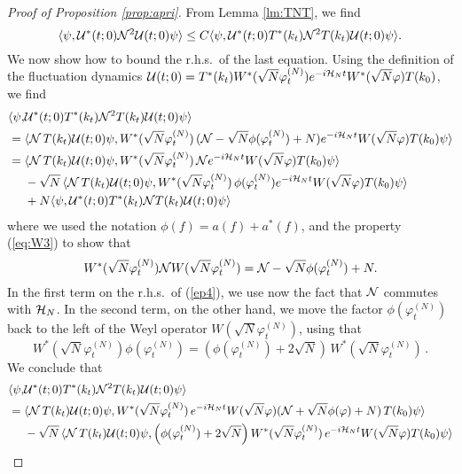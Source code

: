 \documentclass[11pt,a4paper]{article}
\newcommand{\cU}{{\cal U}}
\newcommand{\cH}{{\cal H}}
\newcommand{\cN}{{\cal N}}
\newcommand{\N}{\mathcal{N}}
\begin{document}
\begin{proof}[Proof of Proposition \ref{prop:apri}]
{F}rom Lemma \ref{lm:TNT}, we find
\begin{equation}\label{ep4-0}   \langle \psi , \cU^* (t;0) \cN^2 \cU (t;0) \psi \rangle \leq C  \langle \psi , \cU^* (t;0) T^* (k_t) \cN^2 T (k_t) \cU (t;0) \psi \rangle. \end{equation}
We now show how to bound the r.h.s.\ of the last equation. Using the definition of the fluctuation dynamics $\cU (t;0) = T^* (k_t) W^* (\sqrt{N} \varphi_t^{(N)}) e^{-i\cH_N t} W^* (\sqrt{N} \varphi) T (k_0)$, we find 
\begin{equation}\label{ep4}
\begin{split}
\langle \psi, &\cU^* (t;0) T^* (k_t) \N^2 T (k_t) \cU (t;0) \psi \rangle 
     \\  = \; & \langle \cN \, T (k_t) \cU (t;0) \psi,  W^* (\sqrt{N} \varphi_t^{(N)}) \, (\cN - \sqrt{N} \phi (\varphi_t^{(N)}) + N) e^{-i\cH_N t}  W (\sqrt{N} \varphi) T (k_0) \psi \rangle \\
      = \; & \langle \cN \, T (k_t) \cU (t;0) \psi,  W^* (\sqrt{N} \varphi_t^{(N)}) \,  \cN e^{-i \cH_N t}
      W (\sqrt{N} \varphi) T (k_0) \psi \rangle \\ & - \sqrt{N} \, \langle \cN \, T (k_t) \cU (t;0) \psi,  W^* (\sqrt{N} \varphi_t^{(N)} )\, \phi (\varphi_t^{(N)}) e^{-i \cH_N t}  W (\sqrt{N} \varphi) T (k_0) \psi \rangle \\
      &+  N  \langle \psi,\cU^* (t;0) T^* (k_t) \cN T (k_t) \cU (t;0) \psi \rangle 
      \end{split} \end{equation}
where we used the notation $\phi (f) = a( f) + a^* (f)$, and the property (\ref{eq:W3}) to show that 
\[ W^* (\sqrt{N} \varphi_t^{(N)}) \cN W (\sqrt{N} \varphi_t^{(N)}) = \cN - \sqrt{N} \phi (\varphi_t^{(N)})  +N.  \]      
In the first term on the r.h.s.\ of (\ref{ep4}), we use now the fact that $\cN$ commutes with $\cH_N$. In the second term, on the other hand, we move the factor $\phi (\varphi_t^{(N)})$ back to the left of the Weyl operator $W (\sqrt{N} \varphi_t^{(N)})$, using that \[ W^* (\sqrt{N} \varphi_t^{(N)}) \phi (\varphi_t^{(N)}) = \left(\phi (\varphi_t^{(N)}) + 2 \sqrt{N} \right) \, W^* (\sqrt{N} \varphi_t^{(N)})\,. \] We conclude that
\begin{equation}\begin{split}
\langle \psi , &\cU^* (t;0) T^* (k_t) \cN^2 T(k_t) \cU (t;0) \psi \rangle \\ = \; & \langle \cN \, T (k_t) \cU (t;0) \psi,  W^* (\sqrt{N} \varphi_t^{(N)}) \,  e^{-i \cH_N t} W (\sqrt{N} \varphi) (\cN + \sqrt{N} \phi (\varphi) + N) \, T (k_0) \psi \rangle \\ &-  \sqrt{N} \, \langle \cN \, T (k_t) \cU (t;0) \psi,  \left(\phi (\varphi_t^{(N)}) + 2\sqrt{N} \right)  W^* (\sqrt{N} \varphi_t^{(N)}) \, e^{-i \cH_N t}  W (\sqrt{N} \varphi) T (k_0) \psi \rangle \\

\end{split}
\end{equation}
\end{proof}
\end{document}
